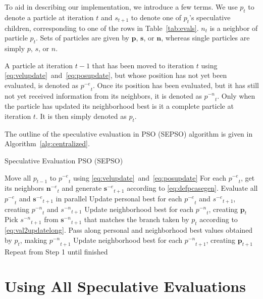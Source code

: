 \documentclass{llncs}
\newcommand{\alg}[1]{Algorithm~\ref{alg:#1}}
\providecommand{\noeval}[1]{\ensuremath{#1^{-e}}}
\providecommand{\nonbest}[1]{\ensuremath{#1^{-n}}}
\providecommand{\p}{\ensuremath{p}}
\providecommand{\pset}{\ensuremath{\mathbf{p}}}
\providecommand{\s}{\ensuremath{s}}
\providecommand{\sset}{\ensuremath{\mathbf{s}}}
\providecommand{\n}{\ensuremath{n}}
\providecommand{\nset}{\ensuremath{\mathbf{n}}}
\begin{document}
To aid in describing our implementation, we introduce a few terms. We use
$\p_t$ to denote a particle at iteration $t$ and $\s_{t+1}$ to denote one of
$\p_t$'s speculative children, corresponding to one of the rows in
Table~\ref{tab:evals}.  $\n_t$ is a neighbor of particle $\p_t$.  Sets of
particles are given by $\pset$, $\sset$, or $\nset$, whereas single particles
are simply $\p$, $\s$, or $\n$.

A particle at iteration $t-1$ that has been moved to iteration $t$ using
\eqref{eq:velupdate}~and~\eqref{eq:posupdate}, but whose position has not yet
been evaluated, is denoted as $\noeval{\p}_t$.  Once its position has been
evaluated, but it has still not yet received information from its neighbors, it
is denoted as $\nonbest{\p}_t$.  Only when the particle has updated its
neighborhood best is it a complete particle at iteration $t$.  It is then
simply denoted as $\p_t$.

The outline of the speculative evaluation in PSO (SEPSO) algorithm is given in
\alg{centralized}.

\begin{algorithm}
  \caption{Speculative Evaluation PSO (SEPSO)}
  \label{alg:centralized}
  \begin{algorithmic}[1]
	\STATE Move all $\p_{t-1}$ to $\noeval{\p}_t$ using
	  \eqref{eq:velupdate}~and~\eqref{eq:posupdate}
	\STATE For each $\noeval{\p}_t$, get its neighbors $\noeval{\nset}_t$ and
	  generate $\noeval{\sset}_{t+1}$ according to
	  \eqref{eq:defpcasegen}.
	\STATE Evaluate all $\noeval{\p}_t$ and $\noeval{\sset}_{t+1}$ in parallel
	\STATE Update personal best for each $\noeval{\p}_t$ and
	  $\noeval{\s}_{t+1}$, creating $\nonbest{\p}_t$ and $\nonbest{\s}_{t+1}$
	\STATE Update neighborhood best for each $\nonbest{\p}_t$, creating
	  $\pset_t$
	\FORALL{$\p_t$}
	\STATE Pick $\nonbest{\s}_{t+1}$ from $\nonbest{\sset}_{t+1}$ that matches
	  the branch taken by $\p_t$ according to
	  \eqref{eq:val2updatelong}.
	\STATE Pass along personal and neighborhood best values obtained by $\p_t$,
	  making $\nonbest{\p}_{t+1}$
	\ENDFOR
	\STATE Update neighborhood best for each $\nonbest{\p}_{t+1}$, creating
	  $\pset_{t+1}$
	\STATE Repeat from Step 1 until finished
  \end{algorithmic}
\end{algorithm}

\section{Using All Speculative Evaluations}
\label{sec:extra}
\end{document}
